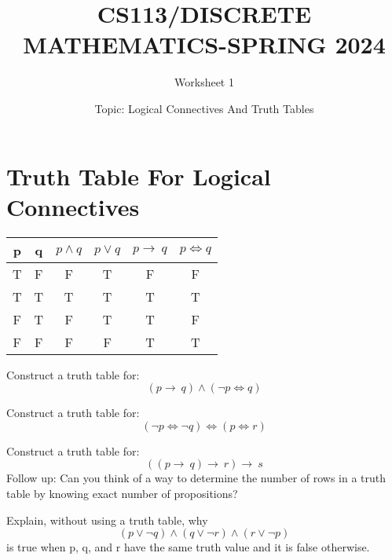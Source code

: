 \documentclass{exam}
\title{CS113/DISCRETE MATHEMATICS-SPRING 2024}
\author{Worksheet 1}
\date{Topic: Logical Connectives And Truth Tables}
\begin{document}
\maketitle

\begin{center}
\end{center}

\vspace{5mm}

\vspace{5mm}
\section{Truth Table For Logical Connectives }
\vspace{5mm}
\begin{center}
\begin{tabular}{||c c c c c c||} 
 \hline
 p & q & $p \land q$ & $p\lor q$ & $p \rightarrow\ q$ & $p \iff q$ \\ [2 ex] 
 \hline\hline
 T & F & F & T & F & F \\ 
 \hline
 T & T & T & T & T & T \\
 \hline
 F & T & F & T & T & F \\
 \hline
 F & F & F & F & T & T \\
 \hline
 
\end{tabular}
\end{center}
\vspace{5mm}


\begin{questions}
\question Construct a truth table for:
$$(p \rightarrow\ q) \land (\neg p \iff q)$$ 
\vspace{8in}

\question Construct a truth table for: 
$$(\neg p \iff \neg q) \iff ( p \iff r)$$ 

\vspace{9in}

\question Construct a truth table for:
$$((p \rightarrow\  q) \rightarrow\ r ) \rightarrow\ s$$ 
Follow up: Can you think of a way to determine the number of rows in a truth table by knowing exact number of propositions?
\vspace{9in}

\question Explain, without using a truth table, why
$$(p \lor \neg q) \land (q \lor  \neg r) \land (r \lor \neg p) $$
is true when p, q, and r have the same truth value and it is false otherwise.


\end{questions}
\end{document}
